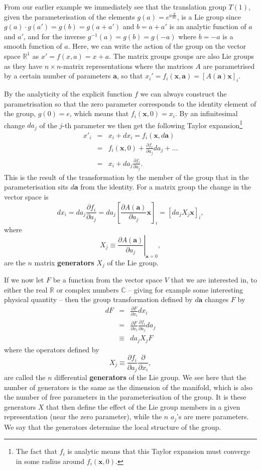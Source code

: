 \documentclass[notes.tex]{subfiles}
\begin{document}
From our earlier example we immediately see that the translation group $T(1)$, given the parameterisation of the elements $g(a) = e^{a\frac{d}{dx}}$, is a Lie group since $g(a)\cdot g(a') =g(b)= g(a+a')$ and $b=a+a'$ is an analytic function of $a$ and $a'$, and for the inverse $g^{-1}(a)=g(b)=g(-a)$ where $b=-a$ is a smooth function of $a$. Here, we can write the action of the group on the vector space $\mathbb{R}^1$ as $x'=f(x,a) = x+a$. The matrix groups groups are also Lie groups as they have $n\times n$-matrix representations where the matrices $A$ are parametrised by a certain number of parameters $\mathbf a$,  so that $x_i'=f_i(\mathbf{x}, \mathbf a) = [A(\mathbf a)\mathbf{x}]_i$. 

By the analyticity of the explicit function $f$ we can always construct the parametrisation so that the zero parameter corresponds to the identity element of the group, $g(0) = e$, which means that  $f_i(\mathbf x, 0)=x_i$. By an infinitesimal change $da_j$ of the $j$-th parameter we then get the following Taylor expansion\footnote{The fact that $f_i$ is analytic means that this Taylor expansion must converge in some radius around $f_i(\mathbf x,0)$.}
\begin{eqnarray*}
x'_i &=& x_i + dx_i = f_i(\mathbf x, d\mathbf a)\\
&=& f_i(\mathbf x, 0) + \frac{\partial f_i}{\partial a_j}da_j +\ldots\\
&=& x_i +da_j \frac{\partial f_i}{\partial a_j}.
\end{eqnarray*}
This is the result of the transformation by the member of the group that in the parameterisation sits $d\mathbf a$ from the identity. For a matrix group the change in the vector space is
\[
dx_i=da_j\frac{\partial f_i}{\partial a_j}=da_j\left[\frac{\partial A(\mathbf a)}{\partial a_j}\mathbf{x}\right]_i=[da_jX_j\mathbf{x}]_i,
\]
where 
\[
X_j\equiv \left. \frac{\partial A(\mathbf a)}{\partial a_j}\right|_{\mathbf a=0} ,
\]
are the $n$ matrix {\bf generators} $X_j$ of the Lie group.

If we now let $F$ be a function from the vector space $V$ that we are interested in, to either the real $\mathbb{R}$ or complex numbers $\mathbb{C}$ -- giving for example some interesting physical quantity -- then the group transformation defined by $d\mathbf a$ changes $F$ by
\begin{eqnarray*}
dF &=& \frac{\partial F}{\partial x_i}dx_i\\
&=& \frac{\partial F}{\partial x_i}\frac{\partial f_i}{\partial a_j}da_j\\
&\equiv& da_j X_j F
\end{eqnarray*}
where the operators defined by \[X_j \equiv\frac{\partial f_i}{\partial a_j} \frac{\partial }{\partial x_i},\] are called the $n$ differential {\bf generators} of the Lie group. We see here that the number of generators is the same as the dimension of the manifold, which is also the number of free parameters in the parameterisation of the group. 
It is these generators $X$ that then define the effect of the Lie group members in a given representation (near the zero parameter), while the $n$ $a_j$'s are mere parameters. We say that the generators determine the local structure of the group.
\end{document}
